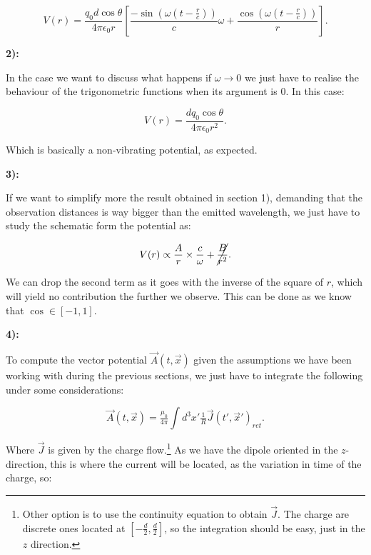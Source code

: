 \begin{equation}
	V(r)= \frac{q_{0} d \cos \theta }{4\pi \epsilon_{0} r}\left[\frac{-\sin (\omega (t -\tfrac{r}{c}))}{c} \omega  + \frac{\cos (\omega (t -\tfrac{r}{c}))}{r}\right].
\end{equation}

\textbf{2):}

In the case we want to discuss what happens if $\omega \rightarrow 0$ we just have to realise the behaviour of the trigonometric functions when its argument is 0. In this case:

\begin{equation}
	V(r) = \frac{d q_{0} \cos\theta}{4 \pi \epsilon_{0} r^{2}}.
\end{equation}

Which is basically a non-vibrating potential, as expected.

\textbf{3):}

If we want to simplify more the result obtained in section 1), demanding that the observation distances is way bigger than the emitted wavelength, we just have to study the schematic form the potential as:

\begin{equation}\label{potentialatlarger}
	V(r) \propto \frac{A}{r}\times \frac{c}{\omega} + \cancel{\frac{B}{r^{2}}}.
\end{equation}

We can drop the second term as it goes with the inverse of the square of $r$, which will yield no contribution the further we observe. This can be done as we know that $\cos \in [-1,1]$.

\textbf{4):}

To compute the vector potential $\vec{A}(t,\vec{x})$ given the assumptions we have been working with during the previous sections, we just have to integrate the following under some considerations:

\begin{equation}
	\vec{A}(t,\vec{x}) = \tfrac{\mu_{0}}{4\pi}\int d^{3} x' \tfrac{1}{R} \vec{J}(t', \vec{x}')_{ret}.
\end{equation}

Where $\vec{J}$ is given by the charge flow.\footnote{Other option is to use the continuity equation to obtain $\vec{J}$. The charge are discrete ones located at $[-\tfrac{d}{2},\tfrac{d}{2}]$, so the integration should be easy, just in the $z$ direction.} As we have the dipole oriented in the $z$-direction, this is where the current will be located, as the variation in time of the charge, so:

